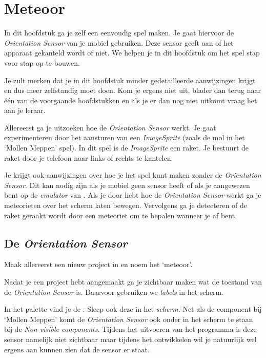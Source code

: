 ﻿\chapter{Meteoor}

In dit hoofdstuk ga je zelf een eenvoudig spel maken. Je gaat hiervoor de \emph{Orientation Sensor} van je mobiel gebruiken. Deze sensor geeft aan of het apparaat gekanteld wordt of niet. We helpen je in dit hoofdstuk om het spel stap voor stap op te bouwen.

Je zult merken dat je in dit hoofdstuk minder gedetailleerde aanwijzingen krijgt en dus meer zelfstandig moet doen. Kom je ergens niet uit, blader dan terug naar \'e\'en van de voorgaande hoofdstukken en als je er dan nog niet uitkomt vraag het aan je leraar.

Allereerst ga je uitzoeken hoe de \emph{Orientation Sensor} werkt. Je gaat experimenteren door het aansturen van een \emph{ImageSprite} (zoals de mol in het `Mollen Meppen' spel). In dit spel is de \emph{ImageSprite} een raket. Je bestuurt de raket door je telefoon naar links of rechts te kantelen.

Je krijgt ook aanwijzingen over hoe je het spel kunt maken zonder de \emph{Orientation Sensor}. Dit kan nodig zijn als je mobiel geen sensor heeft of als je aangewezen bent op de \emph{emulator} van \ai. Als je door hebt hoe de \emph{Orientation Sensor} werkt ga je meteorieten over het scherm laten bewegen. Vervolgens ga je detecteren of de raket geraakt wordt door een meteoriet om te bepalen wanneer je af bent.


\section{De \emph{Orientation Sensor}}
\begin{opgave}
    \opgVraag
  Maak allereerst een nieuw project in \ai en noem het `meteoor'.
\end{opgave}

Nadat je een project hebt aangemaakt ga je zichtbaar maken wat de toestand van de \emph{Orientation Sensor} is. Daarvoor gebruiken we \emph{labels} in het  scherm.

In het  palette vind je de . Sleep ook deze in het \emph{scherm}. Net als de  component bij `Mollen Meppen' komt de \emph{Orientation Sensor} ook onder in het scherm te staan bij de \emph{Non-visible components}. Tijdens het uitvoeren van het programma is deze sensor namelijk niet zichtbaar maar tijdens het ontwikkelen wil je natuurlijk wel ergens aan kunnen zien dat de sensor er staat. 


